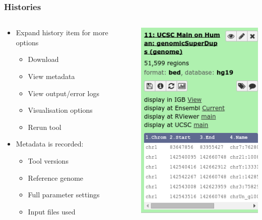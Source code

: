 \documentclass{beamer}              %
\begin{document}
\begin{frame}
\frametitle{Histories}
  \begin{columns}[T]
    \begin{column}{.82\textwidth}
	\begin{itemize}
	\item Expand history item for more options
		\begin{itemize}
		\item Download
		\item View metadata
		\item View output/error logs
		\item Visualisation options
		\item Rerun tool
		\end{itemize}
	\item Metadata is recorded:
		\begin{itemize}
		\item Tool versions
		\item Reference genome
		\item Full parameter settings
		\item Input files used
		\end{itemize}
	\end{itemize}
    \end{column}
    \begin{column}{.18\textwidth}
		\includegraphics[width=\textwidth,right]{figures/101p_04b.png}

\end{column}
\end{columns}
\end{frame}
\end{document}
